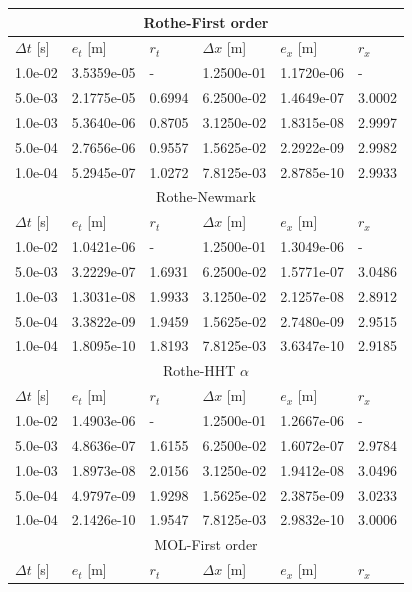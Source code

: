\documentclass{sfuthesis}
\numberwithin{equation}{section}
\numberwithin{figure}{chapter}
\numberwithin{table}{chapter}
\theoremstyle{definition}
\begin{document}
\begin{table}
    \centering
    \begin{tabular}{|l|l|l|l|l|l|}
        \hline
        \multicolumn{6}{|c|}{Rothe-First order} \\\hline
        $\Delta t$ [s] & $e_t$ [m] & $r_t$ & $\Delta x$ [m] & $e_x$ [m] & $r_x$ \\\hline
        1.0e-02&3.5359e-05&-&1.2500e-01&1.1720e-06&-\\\hline
        5.0e-03&2.1775e-05&0.6994&6.2500e-02&1.4649e-07&3.0002\\\hline
        1.0e-03&5.3640e-06&0.8705&3.1250e-02&1.8315e-08&2.9997\\\hline
        5.0e-04&2.7656e-06&0.9557&1.5625e-02&2.2922e-09&2.9982\\\hline
        1.0e-04&5.2945e-07&1.0272&7.8125e-03&2.8785e-10&2.9933\\\hline\hline
        \multicolumn{6}{|c|}{Rothe-Newmark} \\\hline
        $\Delta t$ [s] & $e_t$ [m] & $r_t$ & $\Delta x$ [m] & $e_x$ [m] & $r_x$ \\\hline
        1.0e-02&1.0421e-06&-&1.2500e-01&1.3049e-06&-\\\hline
        5.0e-03&3.2229e-07&1.6931&6.2500e-02&1.5771e-07&3.0486\\\hline
        1.0e-03&1.3031e-08&1.9933&3.1250e-02&2.1257e-08&2.8912\\\hline
        5.0e-04&3.3822e-09&1.9459&1.5625e-02&2.7480e-09&2.9515\\\hline
        1.0e-04&1.8095e-10&1.8193&7.8125e-03&3.6347e-10&2.9185\\\hline\hline
        \multicolumn{6}{|c|}{Rothe-HHT $\alpha$} \\\hline
        $\Delta t$ [s] & $e_t$ [m] & $r_t$ & $\Delta x$ [m] & $e_x$ [m] & $r_x$ \\\hline
        1.0e-02&1.4903e-06&-&1.2500e-01&1.2667e-06&-\\\hline
        5.0e-03&4.8636e-07&1.6155&6.2500e-02&1.6072e-07&2.9784\\\hline
        1.0e-03&1.8973e-08&2.0156&3.1250e-02&1.9412e-08&3.0496\\\hline
        5.0e-04&4.9797e-09&1.9298&1.5625e-02&2.3875e-09&3.0233\\\hline
        1.0e-04&2.1426e-10&1.9547&7.8125e-03&2.9832e-10&3.0006\\\hline\hline
        \multicolumn{6}{|c|}{MOL-First order} \\\hline
        $\Delta t$ [s] & $e_t$ [m] & $r_t$ & $\Delta x$ [m] & $e_x$ [m] & $r_x$ \\\hline

\end{tabular}
\end{table}
\end{document}
